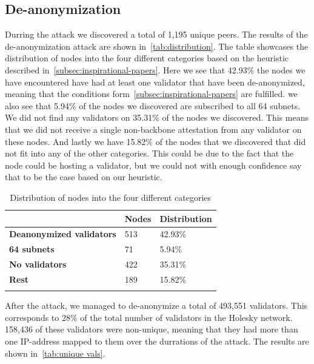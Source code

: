 \subsection{De-anonymization}\label{subsec:deanonymization}
Durring the attack we discovered a total of 1,195 unique peers.
The results of the de-anonymization attack are shown in~\autoref{tab:distribution}.
The table showcases the distribution of nodes into the four different categories based on the heuristic described in~\autoref{subsec:inspirational-papers}.
Here we see that 42.93\% the nodes we have encountered have had at least one validator that have been de-anonymized, meaning that the conditions form~\autoref{subsec:inspirational-papers} are fulfilled.
we also see that 5.94\% of the nodes we discovered are subscribed to all 64 subnets.
We did not find any validators on 35.31\% of the nodes we discovered.
This means that we did not receive a single non-backbone attestation from any validator on these nodes.
And lastly we have 15.82\% of the nodes that we discovered that did not fit into any of the other categories.
This could be due to the fact that the node could be hosting a validator, but we could not with enough confidence say that to be the case based on our heuristic.


\begin{table}[]
    \centering
    \begin{tabular}{lll}
        \hline
        & \textbf{Nodes} & \textbf{Distribution} \\ \hline
        \textbf{Deanonymized validators} & 513            & 42.93\%                 \\
        \textbf{64 subnets}              & 71             & 5.94\%                  \\
        \textbf{No validators}           & 422              & 35.31\%               \\
        \textbf{Rest}                    & 189            & 15.82\%                 \\ \hline
        \\
    \end{tabular}
    \caption{Distribution of nodes into the four different categories}
    \label{tab:distribution}
\end{table}


After the attack, we managed to de-anonymize a total of 493,551 validators.
This corresponds to 28\% of the total number of validators in the Holesky network.
158,436 of these validators were non-unique, meaning that they had more than one IP-address mapped to them over the durrations of the attack.
The results are shown in~\autoref{tab:unique vals}.


